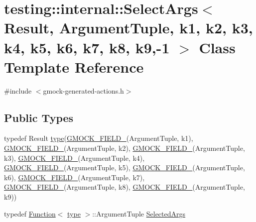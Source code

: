 \hypertarget{classtesting_1_1internal_1_1SelectArgs_3_01Result_00_01ArgumentTuple_00_01k1_00_01k2_00_01k3_00_6cec9358efe806d84292a8e378f8b1d2}{}\section{testing\+:\+:internal\+:\+:Select\+Args$<$ Result, Argument\+Tuple, k1, k2, k3, k4, k5, k6, k7, k8, k9,-\/1 $>$ Class Template Reference}
\label{classtesting_1_1internal_1_1SelectArgs_3_01Result_00_01ArgumentTuple_00_01k1_00_01k2_00_01k3_00_6cec9358efe806d84292a8e378f8b1d2}


{\ttfamily \#include $<$gmock-\/generated-\/actions.\+h$>$}

\subsection*{Public Types}
\begin{DoxyCompactItemize}
\item 
typedef Result \hyperlink{classtesting_1_1internal_1_1SelectArgs_3_01Result_00_01ArgumentTuple_00_01k1_00_01k2_00_01k3_00_6cec9358efe806d84292a8e378f8b1d2_aa370f95245d998aea225e3f24f3b9208}{type}(\hyperlink{gmock-generated-actions_8h_a6eb3ce92b0613603057a20ec9e593317}{G\+M\+O\+C\+K\+\_\+\+F\+I\+E\+L\+D\+\_\+}(Argument\+Tuple, k1), \hyperlink{gmock-generated-actions_8h_a6eb3ce92b0613603057a20ec9e593317}{G\+M\+O\+C\+K\+\_\+\+F\+I\+E\+L\+D\+\_\+}(Argument\+Tuple, k2), \hyperlink{gmock-generated-actions_8h_a6eb3ce92b0613603057a20ec9e593317}{G\+M\+O\+C\+K\+\_\+\+F\+I\+E\+L\+D\+\_\+}(Argument\+Tuple, k3), \hyperlink{gmock-generated-actions_8h_a6eb3ce92b0613603057a20ec9e593317}{G\+M\+O\+C\+K\+\_\+\+F\+I\+E\+L\+D\+\_\+}(Argument\+Tuple, k4), \hyperlink{gmock-generated-actions_8h_a6eb3ce92b0613603057a20ec9e593317}{G\+M\+O\+C\+K\+\_\+\+F\+I\+E\+L\+D\+\_\+}(Argument\+Tuple, k5), \hyperlink{gmock-generated-actions_8h_a6eb3ce92b0613603057a20ec9e593317}{G\+M\+O\+C\+K\+\_\+\+F\+I\+E\+L\+D\+\_\+}(Argument\+Tuple, k6), \hyperlink{gmock-generated-actions_8h_a6eb3ce92b0613603057a20ec9e593317}{G\+M\+O\+C\+K\+\_\+\+F\+I\+E\+L\+D\+\_\+}(Argument\+Tuple, k7), \hyperlink{gmock-generated-actions_8h_a6eb3ce92b0613603057a20ec9e593317}{G\+M\+O\+C\+K\+\_\+\+F\+I\+E\+L\+D\+\_\+}(Argument\+Tuple, k8), \hyperlink{gmock-generated-actions_8h_a6eb3ce92b0613603057a20ec9e593317}{G\+M\+O\+C\+K\+\_\+\+F\+I\+E\+L\+D\+\_\+}(Argument\+Tuple, k9))
\item 
typedef \hyperlink{structtesting_1_1internal_1_1Function}{Function}$<$ \hyperlink{classtesting_1_1internal_1_1SelectArgs_3_01Result_00_01ArgumentTuple_00_01k1_00_01k2_00_01k3_00_6cec9358efe806d84292a8e378f8b1d2_aa370f95245d998aea225e3f24f3b9208}{type} $>$\+::Argument\+Tuple \hyperlink{classtesting_1_1internal_1_1SelectArgs_3_01Result_00_01ArgumentTuple_00_01k1_00_01k2_00_01k3_00_6cec9358efe806d84292a8e378f8b1d2_a620901c52dc62d8ab6ca88625cb63dc5}{Selected\+Args}
\end{DoxyCompactItemize}
